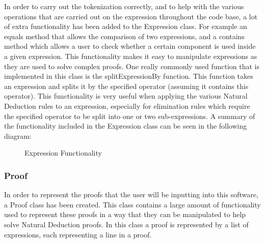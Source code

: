 In order to carry out the tokenization correctly, and to help with the various operations that are carried out on the expression throughout the code base, a lot of extra functionality has been added to the Expression class. For example an equals method that allows the comparison of two expressions, and a contains method which allows a user to check whether a certain component is used inside a given expression. This functionality makes it easy to manipulate expressions as they are used to solve complex proofs. One really commonly used function that is implemented in this class is the splitExpressionBy function. This function takes an expression and splits it by the specified operator (assuming it contains this operator). This functionality is very useful when applying the various Natural Deduction rules to an expression, especially for elimination rules which require the specified operator to be split into one or two sub-expressions. A summary of the functionality included in the Expression class can be seen in the following diagram:

\begin{figure}[!ht]
	\centering
	\caption{Expression Functionality}
\end{figure}

\subsubsection{Proof}

In order to represent the proofs that the user will be inputting into this software, a Proof class has been created. This class contains a large amount of functionality used to represent these proofs in a way that they can be manipulated to help solve Natural Deduction proofs. In this class a proof is represented by a list of expressions, each representing a line in a proof. 

